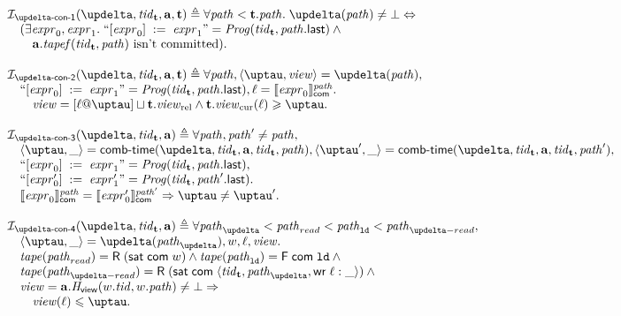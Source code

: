 \[\begin{array}{l}
\invDeltaDefOne(\delta, \tId_{\tT}, \aT, \tT) \triangleq \forall \cpath < \tT.\cpath. \; \delta(\cpath) \not = \bot \Leftrightarrow \\
\quad (\exists \expr_0, \expr_1. \; ``\writeInst{\expr_0}{\expr_1}" = \Cfarm(\tId_{\tT}, \lastInstr{\cpath}) \land {} \\
\qquad \aT.\tapef(\tId_{\tT}, \cpath) \text{ isn't committed}). \\
\\
\invDeltaDefTwo(\delta, \tId_{\tT}, \aT, \tT) \triangleq \forall \cpath, \angled{\tau, \R} = \delta(\cpath), \\
\quad ``\writeInst{\expr_0}{\expr_1}" = \Cfarm(\tId_{\tT}, \lastInstr{\cpath}), \loc = \semfcom{\expr_0}{\cpath}. \\
\qquad \R = [\loc @ \tau] \sqcup \tT.\Rrel \land \tT.\Rcur(\loc) \ge \tau. \\
\\
\invDeltaDefThree(\delta, \tId_{\tT}, \aT) \triangleq
  \forall \cpath, \cpath' \not = \cpath, \\
\quad \angled{\tau, \_} = \deltaHmap(\delta, \tId_{\tT}, \aT, \tId_{\tT}, \cpath),
  \angled{\tau', \_} = \deltaHmap(\delta, \tId_{\tT}, \aT, \tId_{\tT}, \cpath'), \\
\quad ``\writeInst{\expr_0}{\expr_1}"   = \Cfarm(\tId_{\tT}, \lastInstr{\cpath}), \\
\quad ``\writeInst{\expr'_0}{\expr'_1}" = \Cfarm(\tId_{\tT}, \lastInstr{\cpath'}). \\
\quad \semfcom{\expr_0}{\cpath} = \semfcom{\expr'_0}{\cpath'} \Rightarrow \tau \not = \tau'. \\
\\
\invDeltaDefFour(\delta, \tId_{\tT}, \aT) \triangleq
      \forall \cpath_{\delta} < \cpath_{read} < \cpath_{\LD} < \cpath_{\delta-read}, \\
\quad \angled{\tau, \_} = \delta(\cpath_{\delta}), \w, \loc, \R. \\
\quad \tape(\cpath_{read}) = \tapeRead{(\tapeSatisfied{\Committed}{\w})} \land \tape(\cpath_{\LD}) = \tapeFence{\Committed}{\LD} \land {} \\
\quad \tape(\cpath_{\delta-read}) = \tapeRead{(\tapeSatisfied{\Committed}{\stRequestWrite{\tId_{\tT}}{\cpath_{\delta}}{\loc}{\_}})} \land {} \\
\quad \R = \aT.\rmap(\w.\tId, \w.\cpath) \not = \bot
      \Rightarrow \\
\qquad \R(\loc) \le \tau. \\
\end{array}\]


